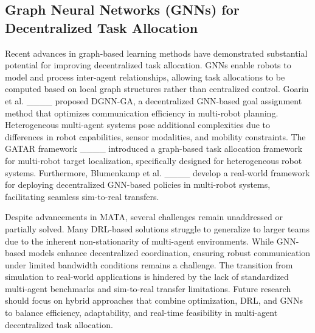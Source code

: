 \subsection{Graph Neural Networks (GNNs) for Decentralized Task Allocation}
Recent advances in graph-based learning methods have demonstrated substantial potential for improving decentralized task allocation. GNNs enable robots to model and process inter-agent relationships, allowing task allocations to be computed based on local graph structures rather than centralized control. Goarin et al. ____ proposed DGNN-GA, a decentralized GNN-based goal assignment method that optimizes communication efficiency in multi-robot planning. Heterogeneous multi-agent systems pose additional complexities due to differences in robot capabilities, sensor modalities, and mobility constraints. The GATAR framework ____ introduced a graph-based task allocation framework for multi-robot target localization, specifically designed for heterogeneous robot systems. Furthermore, Blumenkamp et al. ____ develop a real-world framework for deploying decentralized GNN-based policies in multi-robot systems, facilitating seamless sim-to-real transfers. 

Despite advancements in MATA, several challenges remain unaddressed or partially solved. Many DRL-based solutions struggle to generalize to larger teams due to the inherent non-stationarity of multi-agent environments. While GNN-based models enhance decentralized coordination, ensuring robust communication under limited bandwidth conditions remains a challenge. The transition from simulation to real-world applications is hindered by the lack of standardized multi-agent benchmarks and sim-to-real transfer limitations. 
 Future research should focus on hybrid approaches that combine optimization, DRL, and GNNs to balance efficiency, adaptability, and real-time feasibility in multi-agent decentralized task allocation.
